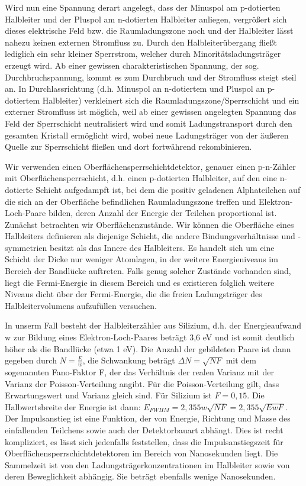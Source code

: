 \documentclass[bigchapter,colorback,accentcolor=tud4b,linedtoc,11pt]{tudreport}
\begin{document}
Wird nun eine Spannung derart angelegt, dass der Minuspol am p-dotierten Halbleiter und der Pluspol am n-dotierten Halbleiter anliegen, vergrößert sich dieses elektrische Feld bzw. die Raumladungszone noch und der Halbleiter lässt nahezu keinen externen Stromfluss zu. Durch den Halbleiterübergang fließt lediglich ein sehr kleiner Sperrstrom, welcher durch Minoritätsladungsträger erzeugt wird. Ab einer gewissen charakteristischen Spannung, der sog. Durchbruchspannung, kommt es zum Durchbruch und der Stromfluss steigt steil an. In Durchlassrichtung (d.h. Minuspol an n-dotiertem und Pluspol an p-dotiertem Halbleiter) verkleinert sich die Raumladungszone/Sperrschicht und ein externer Stromfluss ist möglich, weil ab einer gewissen angelegten Spannung das Feld der Sperrschicht neutralisiert wird und somit Ladungstransport durch den gesamten Kristall ermöglicht wird, wobei neue Ladungsträger von der äußeren Quelle zur Sperrschicht fließen und dort fortwährend rekombinieren.

Wir verwenden einen Oberflächensperrschichtdetektor, genauer einen p-n-Zähler mit Oberflächensperrschicht, d.h. einen p-dotierten Halbleiter, auf den eine n-dotierte Schicht aufgedampft ist, bei dem die positiv geladenen Alphateilchen auf die sich an der Oberfläche befindlichen Raumladungszone treffen und Elektron-Loch-Paare bilden, deren Anzahl der Energie der Teilchen proportional ist. Zunächst betrachten wir Oberflächenzustände. Wir können die Oberfläche eines Halbleiters definieren als diejenige Schicht, die andere Bindungsverhältnisse und -symmetrien besitzt als das Innere des Halbleiters. Es handelt sich um eine Schicht der Dicke nur weniger Atomlagen, in der weitere Energieniveaus im Bereich der Bandlücke auftreten. Falls genug solcher Zustände vorhanden sind, liegt die Fermi-Energie in diesem Bereich und es existieren folglich weitere Niveaus dicht über der Fermi-Energie, die die freien Ladungsträger des Halbleitervolumens aufzufüllen versuchen. 

In unserm Fall besteht der Halbleiterzähler aus Silizium, d.h. der Energieaufwand w zur Bildung eines Elektron-Loch-Paares beträgt 3,6 eV und ist somit deutlich höher als die Bandlücke (etwa 1 eV). Die Anzahl der gebildeten Paare ist dann gegeben durch $N = \frac{E}{w}$, die Schwankung beträgt $\Delta N = \sqrt{N F}$ mit dem sogenannten Fano-Faktor F, der das Verhältnis der realen Varianz mit der Varianz der Poisson-Verteilung angibt. Für die Poisson-Verteilung gilt, dass Erwartungswert und Varianz gleich sind. Für Silizium ist $F = 0,15$. Die Halbwertsbreite der Energie ist dann: $E_{FWHM} = 2,355 w \sqrt{N F} = 2,355 \sqrt{E w F}$.
Der Impulsanstieg ist eine Funktion, der von Energie, Richtung und Masse des einfallenden Teilchens sowie auch der Detektorbauart abhängt. Dies ist recht kompliziert, es lässt sich jedenfalls feststellen, dass die Impulsanstiegszeit für Oberflächensperrschichtdetektoren im Bereich von Nanosekunden liegt. Die Sammelzeit ist von den Ladungsträgerkonzentrationen im Halbleiter sowie von deren Beweglichkeit abhängig. Sie beträgt ebenfalls wenige Nanosekunden.
\end{document}
